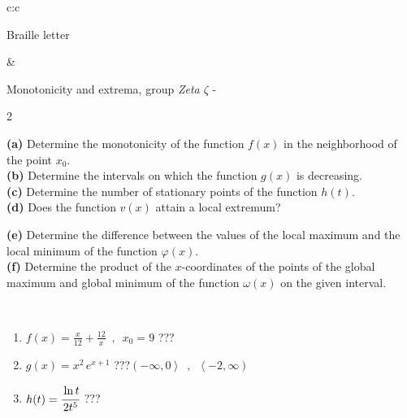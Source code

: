 \documentclass[10pt]{report}
\begin{document}
\begin{tabular}{c:c}
\begin{minipage}[c][104.5mm][t]{0.5\linewidth}
\begin{center}
\begin{minipage}{0.20\linewidth}
\begin{center}
{\small Braille letter}
\end{center}
\end{minipage}
\end{center}
\end{minipage}
&
\begin{minipage}[c][104.5mm][t]{0.5\linewidth}
\begin{center}
\vspace{5mm}
{\huge Monotonicity and extrema, group \textit{Zeta $\zeta$} -}\\[5mm]
\begin{minipage}{0.95\linewidth}
\begin{center}
{\small \begin{multicols}{2} \raggedright
\textbf{(a)} Determine the monotonicity of the function \(f(x)\) in the neighborhood of the point \(x_0\). \\[1mm]
\textbf{(b)} Determine the intervals on which the function \(g(x)\) is decreasing. \\[1mm]
\textbf{(c)} Determine the number of stationary points of the function \(h(t)\). \\[1mm]
\textbf{(d)} Does the function \(v(x)\) attain a local extremum? \par \columnbreak
\textbf{(e)} Determine the difference between the values of the local maximum and the local minimum of the function \(\varphi(x)\). \\[1mm]
\textbf{(f)} Determine the product of the \(x\)-coordinates of the points of the global maximum and global minimum of the function \(\omega(x)\) on the given interval. \\[1mm]
\end{multicols}
}
\end{center}
\end{minipage}
\\[1mm]
\begin{minipage}{0.79\linewidth}
\begin{center}
\begin{varwidth}{\linewidth}
\setlength{\itemsep}{0pt}
\begin{enumerate}
\normalsize
\item $f(x)=\frac{x}{12}+\frac{12}{x} \enspace , \enspace x_0=9$\quad \dotfill\; ???\;\dotfill \quad {}
\item $g(x)=x^2\, e^{x+1}$\quad \dotfill\; ???\;\dotfill \quad $\left(-\infty , 0\right\rangle\enspace , \enspace \left\langle-2 , \infty\right)$
\item $h(t)=\cfrac{\ln t}{2t^5}$\quad \dotfill\; ???\;\dotfill {}

\end{enumerate}
\end{varwidth}
\end{center}
\end{minipage}
\end{center}
\end{minipage}
\end{tabular}
\end{document}
